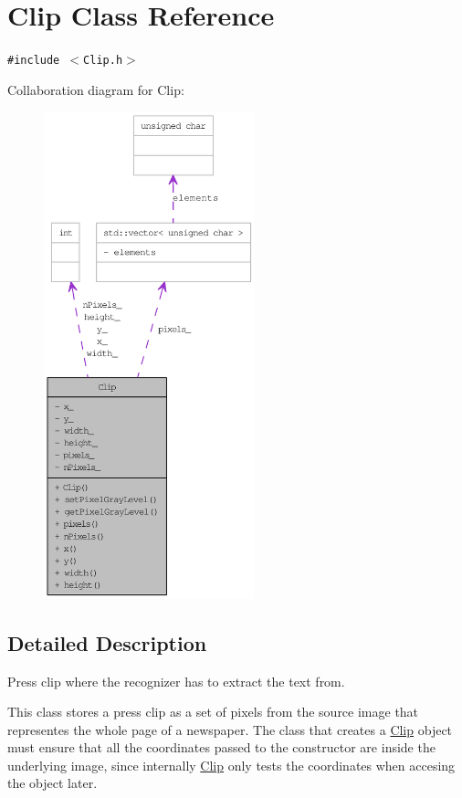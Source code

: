 \hypertarget{class_clip}{
\section{Clip Class Reference}
\label{class_clip}
}
{\tt \#include $<$Clip.h$>$}

Collaboration diagram for Clip:\nopagebreak
\begin{figure}[H]
\begin{center}
\leavevmode
\includegraphics[height=400pt]{class_clip__coll__graph}
\end{center}
\end{figure}


\subsection{Detailed Description}
Press clip where the recognizer has to extract the text from. 

This class stores a press clip as a set of pixels from the source image that representes the whole page of a newspaper. The class that creates a \hyperlink{class_clip}{Clip} object must ensure that all the coordinates passed to the constructor are inside the underlying image, since internally \hyperlink{class_clip}{Clip} only tests the coordinates when accesing the object later.

